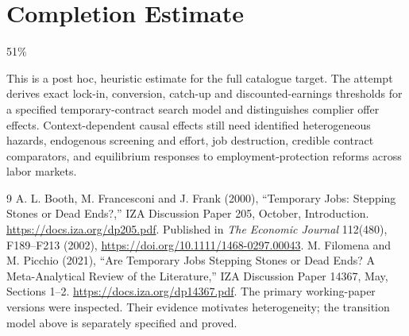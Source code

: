 \documentclass[11pt,a4paper]{article}
\theoremstyle{definition}
\theoremstyle{remark}
\begin{document}
\section{Completion Estimate}
51\%

This is a post hoc, heuristic estimate for the full catalogue target.
The attempt derives exact lock-in, conversion, catch-up and discounted-earnings thresholds for a specified temporary-contract search model and distinguishes complier offer effects. Context-dependent causal effects still need identified heterogeneous hazards, endogenous screening and effort, job destruction, credible contract comparators, and equilibrium responses to employment-protection reforms across labor markets.

\begin{thebibliography}{9}
 A. L. Booth, M. Francesconi and J. Frank (2000), ``Temporary Jobs: Stepping Stones or Dead Ends?,'' IZA Discussion Paper 205, October, Introduction. \url{https://docs.iza.org/dp205.pdf}. Published in \emph{The Economic Journal} 112(480), F189--F213 (2002), \url{https://doi.org/10.1111/1468-0297.00043}.
 M. Filomena and M. Picchio (2021), ``Are Temporary Jobs Stepping Stones or Dead Ends? A Meta-Analytical Review of the Literature,'' IZA Discussion Paper 14367, May, Sections 1--2. \url{https://docs.iza.org/dp14367.pdf}. The primary working-paper versions were inspected. Their evidence motivates heterogeneity; the transition model above is separately specified and proved.
\end{thebibliography}
\end{document}

